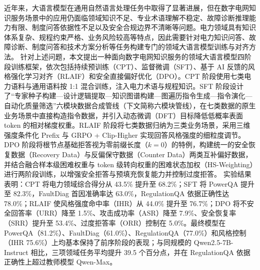 \documentclass[fontset=fandol,type=master,campus=shenzhen,etitleauto=true]{hithesisbook}
\begin{document}
\frontmatter

\begin{cabstract}
近年来，大语言模型在通用自然语言处理任务中取得了显著进展，但在数字电网知识服务场景中的应用仍面临领域知识不足、专业术语理解不稳定、故障诊断推理能力有限、制度问答依据性不足以及安全合规边界不清晰等问题。电力领域具有知识体系复杂、规程约束严格、业务风险较高等特点，因此需要针对电力知识问答、故障诊断、制度问答和技术方案分析等任务构建专门的领域大语言模型训练与对齐方法。
针对上述问题，本文提出一种面向数字电网知识服务的领域大语言模型四阶段训练框架，依次包括持续预训练（CPT）、监督微调（SFT）、基于 AI 反馈的风格强化学习对齐（RLAIF）和安全直接偏好优化（DPO）。CPT 阶段使用七类电力语料与通用语料按 1:1 混合训练，注入电力术语与规程知识。SFT 阶段设计了“专家种子构建—设计逻辑提取—知识图谱构建—图遍历指令生成—指令演化—自动化质量筛选”六模块数据合成管线（下文简称六模块管线），在七类数据的原生业务场景中直接构造指令数据，并引入动态微调（DFT）目标降低低概率表面 token 的相对梯度权重。RLAIF 阶段将七类数据归纳为三类业务场景，采用三维强度条件化 Prefix 与 GRPO + Clip-Higher 实现回答风格强度的细粒度调节。DPO 阶段将根节点基础拒答视为零前缀长度（$k=0$）的特例，构建统一的安全恢复数据（Recovery Data）与反偏保守数据（Counter Data）两类互补偏好数据，并结合融合样本级困难权重与 token 级转向权重的困难状态加权（HS-Weighting）进行两阶段训练，以增强安全拒答与预填充恢复能力并控制过度拒答。
实验结果表明：CPT 将电力领域综合得分从 43.5\% 提升至 68.2\%；SFT 将 PowerQA 提升至 82.3\%，FaultDiag 首因准确率达 63.0\%，RegulationQA 依据正确性达 78.0\%；RLAIF 使风格强度命中率（IHR）从 44.0\% 提升至 76.7\%；DPO 将不安全回答率（URR）降至 1.5\%、攻击成功率（ASR）降至 7.9\%、安全恢复率（SRR）提升至 53.4\%、过度拒答率（ORR）控制在 5.0\%。最终模型在 PowerQA（81.2\%）、FaultDiag（61.0\%）、RegulationQA（77.0\%）和风格控制（IHR 75.6\%）上均基本保持了前序阶段的表现；与同规模的 Qwen2.5-7B-Instruct 相比，三项领域任务平均提升 39.5 个百分点，并在 RegulationQA 依据正确性上超过教师模型 Qwen-Max。
\end{cabstract}
\end{document}
